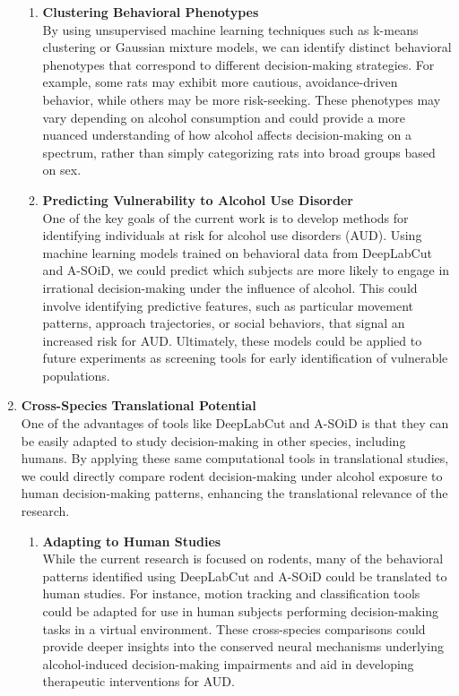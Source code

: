 \documentclass{article}
\begin{document}
\begin{enumerate}
    \begin{enumerate}
        \item \textbf{Clustering Behavioral Phenotypes}\\
        By using unsupervised machine learning techniques such as k-means clustering or Gaussian mixture models, we can identify distinct behavioral phenotypes that correspond to different decision-making strategies. For example, some rats may exhibit more cautious, avoidance-driven behavior, while others may be more risk-seeking. These phenotypes may vary depending on alcohol consumption and could provide a more nuanced understanding of how alcohol affects decision-making on a spectrum, rather than simply categorizing rats into broad groups based on sex.

        \item \textbf{Predicting Vulnerability to Alcohol Use Disorder}\\
        One of the key goals of the current work is to develop methods for identifying individuals at risk for alcohol use disorders (AUD). Using machine learning models trained on behavioral data from DeepLabCut and A-SOiD, we could predict which subjects are more likely to engage in irrational decision-making under the influence of alcohol. This could involve identifying predictive features, such as particular movement patterns, approach trajectories, or social behaviors, that signal an increased risk for AUD. Ultimately, these models could be applied to future experiments as screening tools for early identification of vulnerable populations.

    \end{enumerate}

    \item \textbf{Cross-Species Translational Potential}\\
    One of the advantages of tools like DeepLabCut and A-SOiD is that they can be easily adapted to study decision-making in other species, including humans. By applying these same computational tools in translational studies, we could directly compare rodent decision-making under alcohol exposure to human decision-making patterns, enhancing the translational relevance of the research.

    \begin{enumerate}
        \item \textbf{Adapting to Human Studies}\\
        While the current research is focused on rodents, many of the behavioral patterns identified using DeepLabCut and A-SOiD could be translated to human studies. For instance, motion tracking and classification tools could be adapted for use in human subjects performing decision-making tasks in a virtual environment. These cross-species comparisons could provide deeper insights into the conserved neural mechanisms underlying alcohol-induced decision-making impairments and aid in developing therapeutic interventions for AUD.
    \end{enumerate}
    
\end{enumerate}
\end{document}
